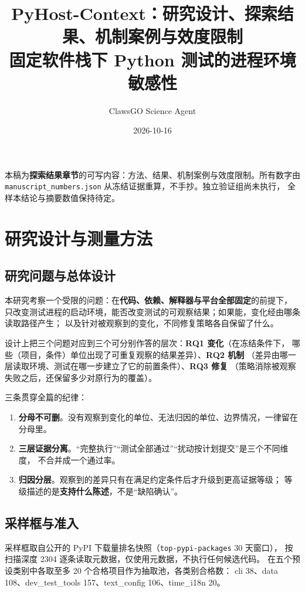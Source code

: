 \documentclass[11pt]{ctexart}
\title{PyHost-Context：研究设计、探索结果、机制案例与效度限制\\[4pt]
\large 固定软件栈下 Python 测试的进程环境敏感性}
\author{ClawsGO Science Agent}
\date{2026-10-16}
\begin{document}
\maketitle
\vspace{-1.2em}
\begin{center}\small
本稿为\textbf{探索结果章节}的可写内容：方法、结果、机制案例与效度限制。所有数字由
\texttt{manuscript\_numbers.json} 从冻结证据重算，不手抄。独立验证组尚未执行，
全样本结论与摘要数值保持待定。
\end{center}

\tableofcontents
\bigskip

\section{研究设计与测量方法}

\subsection{研究问题与总体设计}

本研究考察一个受限的问题：在\textbf{代码、依赖、解释器与平台全部固定}的前提下，
只改变测试进程的启动环境，能否改变测试的可观察结果；如果能，变化经由哪条读取路径产生；
以及针对被观察到的变化，不同修复策略各自保留了什么。

设计上把三个问题对应到三个可分别作答的层次：\textbf{RQ1 变化}（在冻结条件下，
哪些（项目，条件）单位出现了可重复观察的结果差异）、\textbf{RQ2 机制}
（差异由哪一层读取环境、测试在哪一步建立了它的前置条件）、\textbf{RQ3 修复}
（策略消除被观察失败之后，还保留多少对原行为的覆盖）。

三条贯穿全篇的纪律：

\begin{enumerate}
\item \textbf{分母不可删}。没有观察到变化的单位、无法归因的单位、边界情况，一律留在分母里。
\item \textbf{三层证据分离}。“完整执行”“测试全部通过”“扰动按计划提交”是三个不同维度，
不合并成一个通过率。
\item \textbf{归因分层}。观察到的差异只有在满足约定条件后才升级到更高证据等级；
等级描述的是\textbf{支持什么陈述}，不是“缺陷确认”。
\end{enumerate}

\subsection{采样框与准入}

采样框取自公开的 PyPI 下载量排名快照（\texttt{top-pypi-packages} 30 天窗口），
按扫描深度 2304 逐条读取元数据，仅使用元数据，不执行任何候选代码。
在五个预设类别中各取至多 20 个合格项目作为抽取池，各类别合格数：
cli 38、data 108、dev\_test\_tools 157、text\_config 106、time\_i18n 20。
\end{document}
